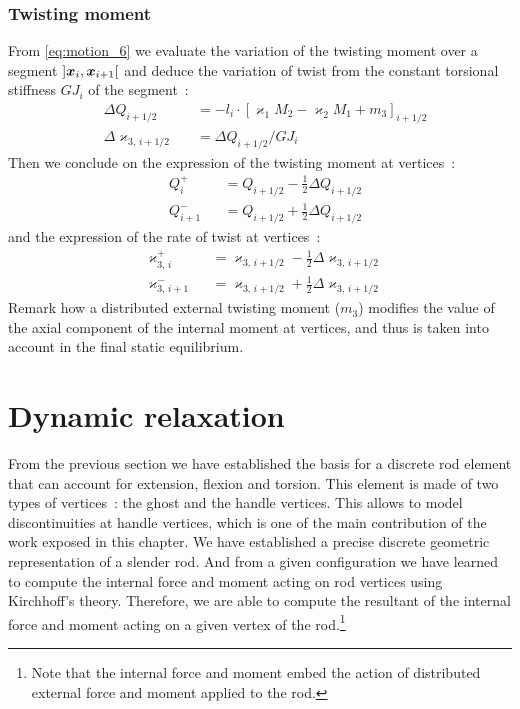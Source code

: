 \subsubsection{Twisting moment}
From \cref{eq:motion_6} we evaluate the variation of the twisting moment over a segment $]\boldsymbol{x}_{i},  \boldsymbol{x}_{i+1}[$ and deduce the variation of twist from the constant torsional stiffness $GJ_i$ of the segment~: 
\begin{subequations}
	\begin{alignat}{2}
		&\Delta Q_{i+1/2} &&= -l_i  \cdot {[\varkappa_1 M_2 - \varkappa_2 M_1 + m_3]}_{i+1/2}
		\label{eq:DeltaQ}
		\\
		&\Delta \varkappa_{3,\,i+1/2} &&= \Delta Q_{i+1/2} / {GJ}_i
	\end{alignat}
\end{subequations}
Then we conclude on the expression of the twisting moment at vertices~:
\begin{subequations}
	\begin{alignat}{2}
		&Q_{i}^{+} &&= Q_{i+1/2} - \frac{1}{2} \Delta Q_{i+1/2}  \\[0.5em]
		&Q_{i+1}^{-} &&= Q_{i+1/2} + \frac{1}{2} \Delta Q_{i+1/2}
	\end{alignat}
	\label{eq:dQi}
\end{subequations}
and the expression of the rate of twist at vertices~:
\begin{subequations}
	\begin{alignat}{2}
		&\varkappa_{3,\,i}^{+} &&= \varkappa_{3,\,i+1/2} - \frac{1}{2} \Delta \varkappa_{3,\,i+1/2}  \\[0.5em]
		&\varkappa_{3,\,i+1}^{-} &&= \varkappa_{3,\,i+1/2} + \frac{1}{2} \Delta \varkappa_{3,\,i+1/2}
	\end{alignat}
\end{subequations}
Remark how a distributed external twisting moment ($m_3$) modifies the value of the axial component of the internal moment at vertices, and thus is taken into account in the final static equilibrium.


\clearpage
\section{Dynamic relaxation}
From the previous section we have established the basis for a discrete rod element that can account for extension, flexion and torsion. This element is made of two types of vertices~: the ghost and the handle vertices. This allows to model discontinuities at handle vertices, which is one of the main contribution of the work exposed in this chapter. We have established a precise discrete geometric representation of a slender rod. And from a given configuration we have learned to compute the internal force and moment acting on rod vertices using Kirchhoff's theory. Therefore, we are able to compute the resultant of the internal force and moment acting on a given vertex of the rod.\footnote{Note that the internal force and moment embed the action of distributed external force and moment applied to the rod.}

